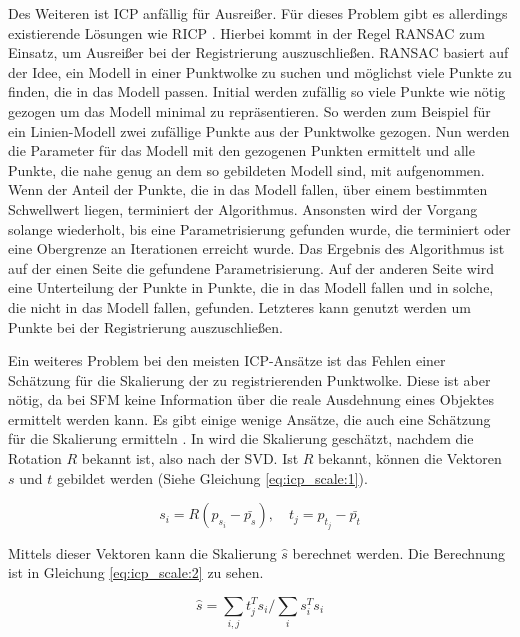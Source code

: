 \documentclass[12pt,titlepage, twoside]{article}
\begin{document}
Des Weiteren ist ICP anfällig für Ausreißer. Für dieses Problem gibt es allerdings existierende Lösungen wie RICP \cite{ICP}. 
Hierbei kommt in der Regel RANSAC \cite{RANSAC} zum Einsatz, um Ausreißer bei der Registrierung auszuschließen.
RANSAC basiert auf der Idee, ein Modell in einer Punktwolke zu suchen und möglichst viele Punkte zu finden, die in das Modell passen. 
Initial werden zufällig so viele Punkte wie nötig gezogen um das Modell minimal zu repräsentieren. 
So werden zum Beispiel für ein Linien-Modell zwei zufällige Punkte aus der Punktwolke gezogen. 
Nun werden die Parameter für das Modell mit den gezogenen Punkten ermittelt und alle Punkte, die nahe genug an dem so gebildeten Modell sind, mit aufgenommen.
Wenn der Anteil der Punkte, die in das Modell fallen, über einem bestimmten Schwellwert liegen, terminiert der Algorithmus. 
Ansonsten wird der Vorgang solange wiederholt, bis eine Parametrisierung gefunden wurde, die terminiert oder eine Obergrenze an Iterationen erreicht wurde.
Das Ergebnis des Algorithmus ist auf der einen Seite die gefundene Parametrisierung. 
Auf der anderen Seite wird eine Unterteilung der Punkte in Punkte, 
die in das Modell fallen und in solche, die nicht in das Modell fallen, gefunden.
Letzteres kann genutzt werden um Punkte bei der Registrierung auszuschließen.

Ein weiteres Problem bei den meisten ICP-Ansätze ist das Fehlen einer Schätzung für die Skalierung der zu registrierenden Punktwolke. 
Diese ist aber nötig, da bei SFM keine Information über die reale Ausdehnung eines Objektes ermittelt werden kann.
Es gibt einige wenige Ansätze, die auch eine Schätzung für die Skalierung ermitteln \cite{Ziner2005PointSR}.
In \cite{Ziner2005PointSR} wird die Skalierung geschätzt, nachdem die Rotation $R$ bekannt ist, also nach der SVD. 
Ist $R$ bekannt, können die Vektoren $s$ und $t$ gebildet werden (Siehe Gleichung \ref{eq:icp_scale:1}).

\begin{equation}
    \label{eq:icp_scale:1}
    s_i = R (p_{s_i} - \bar{p_s}),\quad t_j = p_{t_j} - \bar{p_t}
\end{equation}

Mittels dieser Vektoren kann die Skalierung $\hat{s}$ berechnet werden. Die Berechnung ist in Gleichung \ref{eq:icp_scale:2} zu sehen.

\begin{equation}
    \label{eq:icp_scale:2}
    \hat{s} = \sum_{i,j}{t_j^Ts_i} / \sum_{i}{s_i^Ts_i}
\end{equation}
\end{document}
